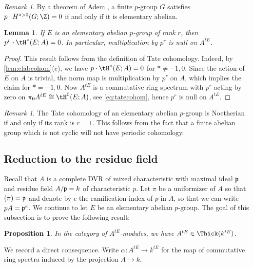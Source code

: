 \documentclass{amsart}%
\numberwithin{equation}{section}%
\newtheorem{Prop}[equation]{Proposition}
\newtheorem{Lem}[equation]{Lemma}
\theoremstyle{remark}
\newtheorem{Rem}[equation]{Remark}
\begin{document}
\begin{Rem}
By a theorem of Adem \cite[Thm.~2.1]{adem_exponent}, a finite $p$-group $G$ satisfies $p\cdot H^{*>0}(G;\Z) = 0$ if and only if it is elementary abelian. 
\end{Rem}

\begin{Lem}\label{lem:elabtatecohom}
If $E$ is an elementary abelian $p$-group of rank $r$, then $p^r\cdot\tH^*(E;A)=0$. In particular, multiplication by $p^r$ is null on $A^{tE}$.
\end{Lem}
\begin{proof}
This result follows from the definition of Tate cohomology. Indeed, by \cref{lem:elabcohom}(c), we have $p\cdot\tH^*(E;A) = 0$ for $* \neq -1,0$. Since the action of $E$ on $A$ is trivial, the norm map is multiplication by $p^r$ on $A$, which implies the claim for $*=-1,0$. Now $A^{tE}$ is a commutative ring spectrum with $p^r$ acting by zero on $\pi_0A^{tE} \cong \tH^0(E;A)$, see \eqref{eq:tatecohom}, hence $p^r$ is null on $A^{tE}$.
\end{proof}

\begin{Rem}
The Tate cohomology of an elementary abelian $p$-group is Noetherian if and only if its rank is $r=1$. This follows from the fact that a finite abelian group which is not cyclic will not have periodic cohomology. 
\end{Rem}


\subsection{Reduction to the residue field}

Recall that $A$ is a complete DVR of mixed characteristic with maximal ideal $\frak p$ and residue field $A/\frak p=k$ of characteristic $p$. Let $\pi$ be a uniformizer of $A$ so that $(\pi) = \frak p$ and denote by $e$ the ramification index of $p$ in $A$, so that we can write $pA = \frak p^e$. We continue to let $E$ be an elementary abelian $p$-group. The goal of this subsection is to prove the following result:

\begin{Prop}\label{prop:elabtategeneration}
In the category of $A^{tE}$-modules, we have $A^{tE} \in \Thick(k^{tE})$.
\end{Prop}

We record a direct consequence. Write $\alpha\colon A^{tE} \to k^{tE}$ for the map of commutative ring spectra induced by the projection $A \to k$.
\end{document}
